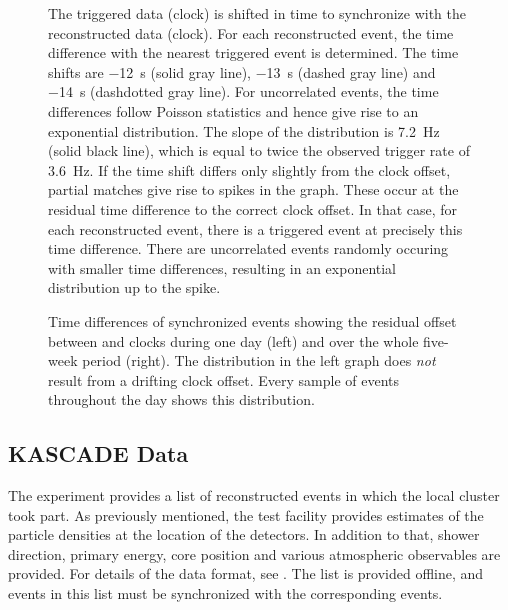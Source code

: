 \begin{figure}
\centering

\caption{The triggered data (\hisparc clock) is shifted in time to
synchronize with the reconstructed data (\kascade clock).  For each
reconstructed event, the time difference with the nearest triggered event
is determined.  The time shifts are \SI{-12}{\second} (solid gray line),
\SI{-13}{\second} (dashed gray line) and \SI{-14}{\second} (dashdotted
gray line).  For uncorrelated events, the time differences follow Poisson
statistics and hence give rise to an exponential distribution.  The slope
of the distribution is \SI{7.2}{\hertz} (solid black line), which is equal
to twice the observed trigger rate of \SI{3.6}{\hertz}.  If the time shift
differs only slightly from the clock offset, partial matches give rise to
spikes in the graph.  These occur at the residual time difference to the
correct clock offset.  In that case, for each reconstructed event, there
is a triggered event at precisely this time difference.  There are
uncorrelated events randomly occuring with smaller time differences,
resulting in an exponential distribution up to the spike.}
\label{fig:timeshifts}
\end{figure}

\begin{figure}
\centering
{

}
\caption{Time differences of synchronized events showing the residual
offset between \hisparc and \kascade clocks during one day (left) and over
the whole five-week period (right).  The distribution in the left graph
does \emph{not} result from a drifting clock offset.  Every sample of
events throughout the day shows this distribution.}
\label{fig:timeshifts-corr}
\end{figure}


\subsection{KASCADE Data}

The \kascade experiment provides a list of reconstructed events in which the
local cluster took part.  As previously mentioned, the test facility provides
estimates of the particle densities at the location of the detectors.  In
addition to that, shower direction, primary energy, core position and various
atmospheric observables are provided.  For details of the data format, see
.  The list is provided offline, and events in this list
must be synchronized with the corresponding \hisparc events.

